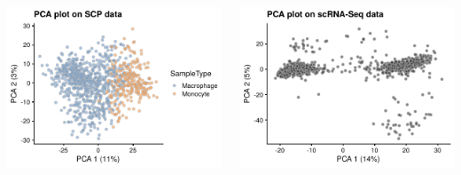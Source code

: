 \documentclass{beamer}
\begin{document}
\begin{frame}[fragile]
    \scriptsize
    \centering
    \begin{columns}
        \begin{column}{0.5\textwidth}
            \includegraphics[width=\textwidth]{figs/PCA_scp.pdf}
        \end{column}
        \begin{column}{0.5\textwidth}
            \includegraphics[width=\textwidth]{figs/PCA_scRnaSeq.pdf}
        \end{column}
    \end{columns}
    
\end{frame}


\end{document}
